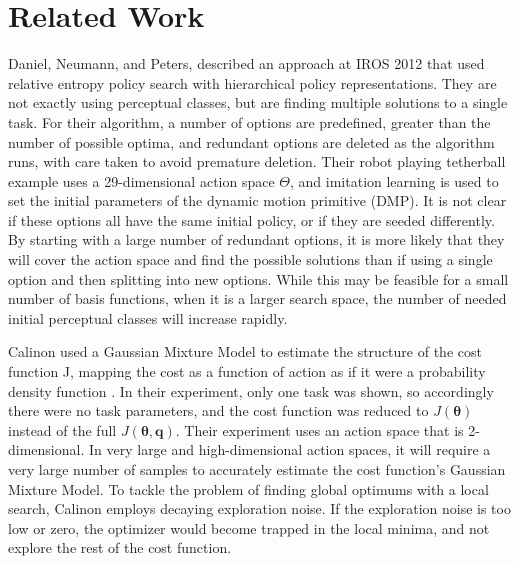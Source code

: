 \documentclass[12pt]{article}
\newcommand{\actsp}{\Theta}
\newcommand{\taskp}{\mathbf{q}}
\newcommand{\costf}{J}
\newcommand{\act}{\bm{\theta}}
\begin{document}
\section{Related Work}

Daniel, Neumann, and Peters, described an approach at IROS 2012 \cite{daniel} that used relative entropy policy search with hierarchical policy representations. They are not exactly using perceptual classes, but are finding multiple solutions to a single task. For their algorithm, a number of options are predefined, greater than the number of possible optima, and redundant options are deleted as the algorithm runs, with care taken to avoid premature deletion. Their robot playing tetherball example uses a 29-dimensional action space $\actsp$, and imitation learning is used to set the initial parameters of the dynamic motion primitive (DMP). It is not clear if these options all have the same initial policy, or if they are seeded differently. By starting with a large number of redundant options, it is more likely that they will cover the action space and find the possible solutions than if using a single option and then splitting into new options. While this may be feasible for a small number of basis functions, when it is a larger search space, the number of needed initial perceptual classes will increase rapidly. 

Calinon used a Gaussian Mixture Model to estimate the structure of the cost function \costf, mapping the cost as a function of action as if it were a probability density function \cite{calinon}. In their experiment, only one task was shown, so accordingly there were no task parameters, and the cost function was reduced to $\costf(\act)$ instead of the full $\costf(\act,\taskp)$. Their experiment uses an action space that is 2-dimensional. In very large and high-dimensional action spaces, it will require a very large number of samples to accurately estimate the cost function's Gaussian Mixture Model. To tackle the problem of finding global optimums with a local search, Calinon employs decaying exploration noise. If the exploration noise is too low or zero, the optimizer would become trapped in the local minima, and not explore the rest of the cost function.
\end{document}
